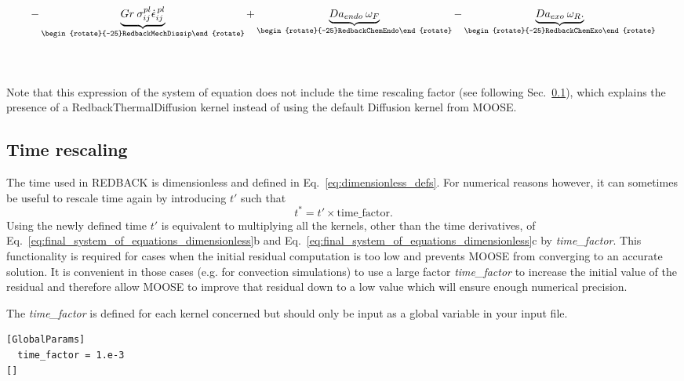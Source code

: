 \documentclass[]{scrreprt}
\newcommand{\moose}{{MOOSE}}
\newcommand{\redback}{{REDBACK}}
\begin{document}
\begin{align*}
  - \underbrace{ Gr \: \sigma_{ij}^{pl}\dot{\epsilon}_{ij}^{\,pl}  }_{\begin{rotate}{-25}RedbackMechDissip\end{rotate}} 
  + \underbrace{ Da_{endo}\: \omega_F }_{\begin{rotate}{-25}RedbackChemEndo\end{rotate}} 
  - \underbrace{ Da_{exo}\: \omega_R. }_{\begin{rotate}{-25}RedbackChemExo\end{rotate}} \\ \\ \\
\end{align*}

Note that this expression of the system of equation does not include the time rescaling factor (see following Sec.~\ref{subsec:time_rescaling}), which explains the presence of a RedbackThermalDiffusion kernel instead of using the default Diffusion kernel from \moose{}.

\subsection{Time rescaling}
\label{subsec:time_rescaling}
The time used in \redback{} is dimensionless and defined in Eq.~\ref{eq:dimensionless_defs}. For numerical reasons however, it can sometimes be useful to rescale time again by introducing $t'$ such that
\begin{equation}
  t^* = t' \times \text{time\_factor}.
\end{equation}
Using the newly defined time $t'$ is equivalent to multiplying all the kernels, other than the time derivatives, of Eq.~\ref{eq:final_system_of_equations_dimensionless}b and Eq.~\ref{eq:final_system_of_equations_dimensionless}c by \textit{time\_factor}. This functionality is required for cases when the initial residual computation is too low and prevents \moose{} from converging to an accurate solution. It is convenient in those cases (e.g. for convection simulations) to use a large factor \textit{time\_factor} to increase the initial value of the residual and therefore allow \moose{} to improve that residual down to a low value which will ensure enough numerical precision. 

The \textit{time\_factor} is defined for each kernel concerned but should only be input as a global variable in your input file.
\begin{lstlisting}
[GlobalParams]
  time_factor = 1.e-3
[]
\end{lstlisting}
\end{document}
